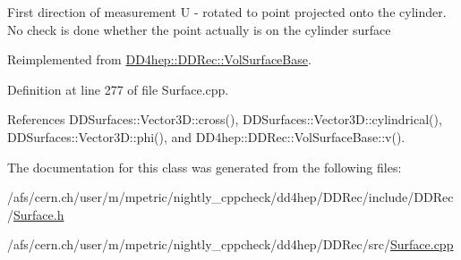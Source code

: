 First direction of measurement U -\/ rotated to point projected onto the cylinder. No check is done whether the point actually is on the cylinder surface 

Reimplemented from \hyperlink{class_d_d4hep_1_1_d_d_rec_1_1_vol_surface_base_a4eb22902d5caf992589142a93accc48d}{D\+D4hep\+::\+D\+D\+Rec\+::\+Vol\+Surface\+Base}.



Definition at line 277 of file Surface.\+cpp.



References D\+D\+Surfaces\+::\+Vector3\+D\+::cross(), D\+D\+Surfaces\+::\+Vector3\+D\+::cylindrical(), D\+D\+Surfaces\+::\+Vector3\+D\+::phi(), and D\+D4hep\+::\+D\+D\+Rec\+::\+Vol\+Surface\+Base\+::v().



The documentation for this class was generated from the following files\+:\begin{DoxyCompactItemize}
\item 
/afs/cern.\+ch/user/m/mpetric/nightly\+\_\+cppcheck/dd4hep/\+D\+D\+Rec/include/\+D\+D\+Rec/\hyperlink{_surface_8h}{Surface.\+h}\item 
/afs/cern.\+ch/user/m/mpetric/nightly\+\_\+cppcheck/dd4hep/\+D\+D\+Rec/src/\hyperlink{_surface_8cpp}{Surface.\+cpp}\end{DoxyCompactItemize}
